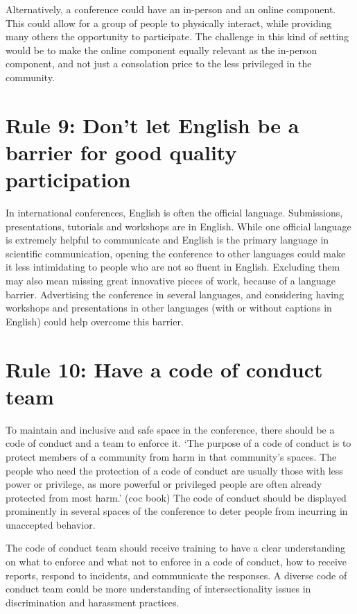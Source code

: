 \documentclass[10pt,letterpaper]{article}
\begin{document}
Alternatively, a conference could have an in-person and an online component. This could allow for a group of people to physically interact, while providing many others the opportunity to participate. The challenge in this kind of setting would be to make the online component equally relevant as the in-person component, and not just a consolation price to the less privileged in the community. 

\section*{Rule 9: Don't let English be a barrier for good quality participation}

In international conferences, English is often the official language. Submissions, presentations, tutorials and workshops are in English. While one official language is extremely helpful to communicate and English is the primary language in scientific communication, opening the conference to other languages could make it less intimidating to people who are not so fluent in English. Excluding them may also mean missing great innovative pieces of work, because of a language barrier. Advertising the conference in several languages, and considering having workshops and presentations in other languages (with or without captions in English) could help overcome this barrier.  

\section*{Rule 10: Have a code of conduct team}

To maintain and inclusive and safe space in the conference, there should be a code of conduct and a team to enforce it. `The purpose of a code of conduct is to protect members of a community from harm in that community's spaces. The people who need the protection of a code of conduct are usually those with less power or privilege, as more powerful or privileged people are often already protected from most harm.' (coc book)
The code of conduct should be displayed prominently in several spaces of the conference to deter people from incurring in unaccepted behavior.

The code of conduct team should receive training to have a clear understanding on what to enforce and what not to enforce in a code of conduct, how to receive reports, respond to incidents, and communicate the responses. A diverse code of conduct team could be more understanding of intersectionality issues in discrimination and harassment practices. 
\end{document}
